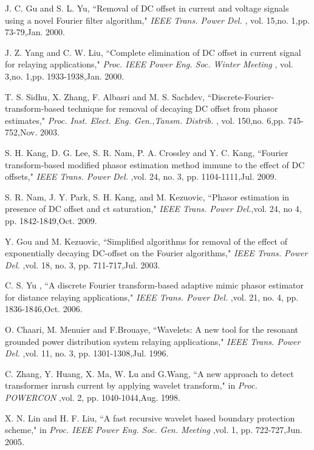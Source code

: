 \documentclass{UCF_ETD}
\begin{document}
\begin{thebibliography}{99}
J. C. Gu and S. L. Yu, ``Removal of DC offset in current and voltage signals using a novel Fourier filter algorithm," \emph{IEEE Trans. Power Del.} , vol. 15,no. 1,pp. 73-79,Jan. 2000.

J. Z. Yang and C. W. Liu, ``Complete elimination of DC offset in current signal for relaying applications," \emph{Proc. IEEE Power Eng. Soc. Winter Meeting} , vol. 3,no. 1,pp. 1933-1938,Jan. 2000.

T. S. Sidhu, X. Zhang, F. Albasri and M. S. Sachdev, ``Discrete-Fourier-transform-based technique for removal of decaying DC offset from phasor estimates," \emph{Proc. Inst. Elect. Eng. Gen.,Tansm. Distrib. } , vol. 150,no. 6,pp. 745-752,Nov. 2003.


S. H. Kang, D. G. Lee, S. R. Nam, P. A. Crossley and Y. C. Kang, ``Fourier transform-based modified phasor estimation method immune to the effect of DC offsets," \emph{IEEE Trans. Power Del.} ,vol. 24, no. 3, pp. 1104-1111,Jul.  2009.

S. R. Nam, J. Y. Park, S. H. Kang, and M. Kezuovic, ``Phasor estimation in presence of DC offset and ct saturation," \emph{IEEE Trans. Power Del.},vol. 24, no 4, pp. 1842-1849,Oct.  2009.

Y. Gou and M. Kezuovic, ``Simplified algorithms for removal of the effect of exponentially decaying DC-offset on the Fourier algorithms," \emph{IEEE Trans. Power Del.} ,vol. 18, no. 3, pp. 711-717,Jul.  2003.

C. S. Yu , ``A discrete Fourier transform-based adaptive mimic phasor estimator for distance relaying applications," \emph{IEEE Trans. Power Del.} ,vol. 21, no. 4, pp. 1836-1846,Oct.  2006.

O. Chaari, M. Menuier and F.Brouaye, ``Wavelets: A new tool for the resonant grounded power distribution system relaying applications," \emph{IEEE Trans. Power Del.} ,vol. 11, no. 3, pp. 1301-1308,Jul.  1996.

C. Zhang, Y. Huang, X. Ma, W. Lu and G.Wang, ``A new approach to detect transformer inrush current by applying wavelet transform," in \emph{Proc. POWERCON} ,vol. 2, pp. 1040-1044,Aug.  1998.

X. N. Lin and H. F. Liu, ``A fast recursive wavelet based boundary protection scheme," in \emph{Proc. IEEE Power Eng. Soc. Gen. Meeting} ,vol. 1, pp. 722-727,Jun.  2005.



\end{thebibliography}
\end{document}
